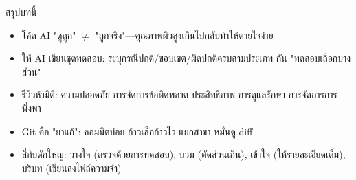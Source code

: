\begin{tcbsummary}{สรุปบทนี้}
\begin{itemize}
  \item โค้ด AI "ดูถูก" $\neq$ "ถูกจริง"—คุณภาพผิวสูงเกินไปกลับทำให้ตายใจง่าย
  \item ให้ AI เขียนชุดทดสอบ: ระบุกรณีปกติ/ขอบเขต/ผิดปกติครบสามประเภท กัน "ทดสอบเลือกบางส่วน"
  \item รีวิวห้ามิติ: ความปลอดภัย การจัดการข้อผิดพลาด ประสิทธิภาพ การดูแลรักษา การจัดการการพึ่งพา
  \item Git คือ "ยาแก้": คอมมิตบ่อย ก้าวเล็กก้าวไว แยกสาขา หมั่นดู diff
  \item สี่กับดักใหญ่: วางใจ (ตรวจด้วยการทดสอบ), บวม (ตัดส่วนเกิน), เข้าใจ (ให้รายละเอียดเต็ม), บริบท (เขียนลงไฟล์ความจำ)
\end{itemize}

\end{tcbsummary}
